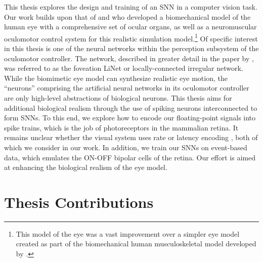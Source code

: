 \documentclass [MS] {UCLAthesis}
\begin{document}
This thesis explores the design and training of an SNN in a computer vision task. Our work builds upon that of \citet{Arjun_thesis} and \citet{Arjun} who developed a biomechanical model of the human eye with a comprehensive set of ocular organs, as well as a neuromuscular oculomotor control system for this realistic simulation model.\footnote{This model of the eye was a vast improvement over a simpler eye model created as part of the biomechanical human musculoskeletal model developed by \citet{Masaki}.} 
Of specific interest in this thesis is one of the neural networks within the perception subsystem of the oculomotor controller. The network, described in greater detail in the paper by \citet{Masaki_linet}, was referred to as the foveation LiNet or locally-connected irregular network. While the biomimetic eye model can synthesize realistic eye motion, the ``neurons'' comprising the artificial neural networks in its oculomotor controller are only high-level abstractions of biological neurons. This thesis aims for additional biological realism through the use of spiking neurons interconnected to form SNNs. To this end, we explore how to encode our floating-point signals into spike trains, which is the job of photoreceptors in the mammalian retina. It remains unclear whether the visual system uses rate or latency encoding \citep{encoding_retina}, both of which we consider in our work. In addition, we train our SNNs on event-based data, which emulates the ON-OFF bipolar cells of the retina. Our effort is aimed at enhancing the biological realism of the eye model.


\section{Thesis Contributions}
\end{document}
